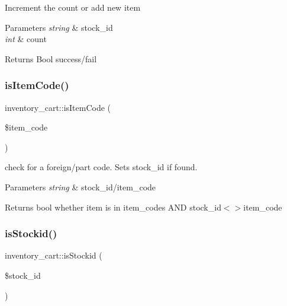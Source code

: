 Increment the count or add new item


\begin{DoxyParams}{Parameters}
{\em string} & stock\+\_\+id \\
\hline
{\em int} & count \\
\hline
\end{DoxyParams}
\begin{DoxyReturn}{Returns}
Bool success/fail 
\end{DoxyReturn}
\hypertarget{classinventory__cart_a1dbd58ee440d2ec8763a8cb5d0241f67}{}\label{classinventory__cart_a1dbd58ee440d2ec8763a8cb5d0241f67} 
\subsubsection{\texorpdfstring{is\+Item\+Code()}{isItemCode()}}
{\footnotesize\ttfamily inventory\+\_\+cart\+::is\+Item\+Code (\begin{DoxyParamCaption}\item[{}]{\$item\+\_\+code }\end{DoxyParamCaption})}

check for a foreign/part code. Sets stock\+\_\+id if found.


\begin{DoxyParams}{Parameters}
{\em string} & stock\+\_\+id/item\+\_\+code \\
\hline
\end{DoxyParams}
\begin{DoxyReturn}{Returns}
bool whether item is in item\+\_\+codes A\+ND stock\+\_\+id$<$$>$item\+\_\+code 
\end{DoxyReturn}
\hypertarget{classinventory__cart_a919740e1d8f9b8d004549eb21e8b551d}{}\label{classinventory__cart_a919740e1d8f9b8d004549eb21e8b551d} 
\subsubsection{\texorpdfstring{is\+Stockid()}{isStockid()}}
{\footnotesize\ttfamily inventory\+\_\+cart\+::is\+Stockid (\begin{DoxyParamCaption}\item[{}]{\$stock\+\_\+id }\end{DoxyParamCaption})}

